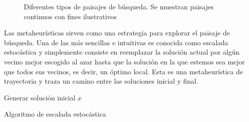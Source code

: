 \begin{figure}[H]
    \caption{Diferentes tipos de paisajes de búsqueda. Se muestran paisajes continuos con fines ilustrativos}
\end{figure}


Las metaheurísticas sirven como una estrategia para explorar el paisaje de búsqueda. Una de las más sencillas e intuitivas es conocida como escalada estocástica y simplemente consiste en reemplazar la solución actual por algún vecino mejor escogido al azar hasta que la solución en la que estemos sea mejor que todos sus vecinos, es decir, un óptimo local. Esta es una metaheurística de trayectoria y traza un camino entre las soluciones inicial y final.

%
\begin{algorithm}[H]
 Generar solución inicial $x$\;
    \label{alg:LS}
    \caption{Algoritmo de escalada estocástica}
\end{algorithm}

